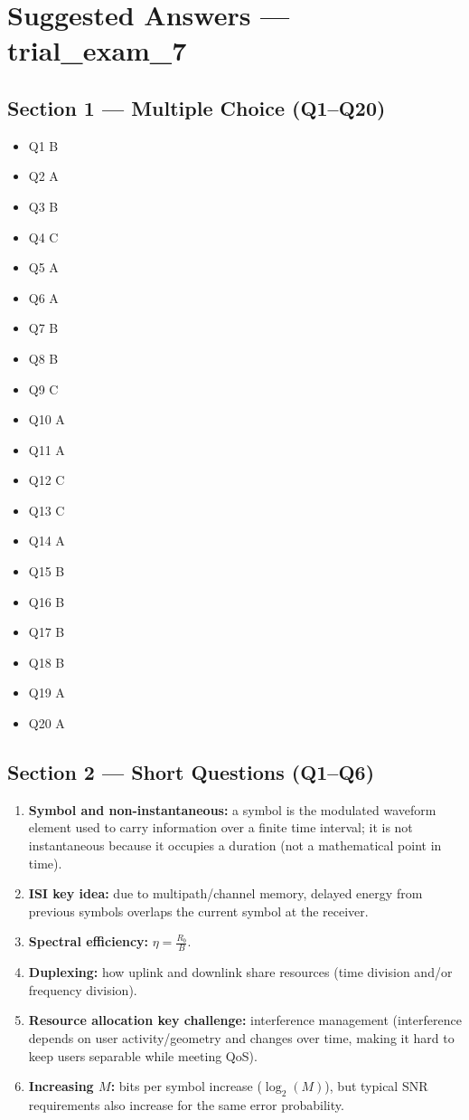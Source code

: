 \documentclass[11pt,a4paper]{article}
\begin{document}
\section*{Suggested Answers --- trial\_exam\_7}

\subsection*{Section 1 --- Multiple Choice (Q1--Q20)}
\begin{itemize}
    \item Q1 B
    \item Q2 A
    \item Q3 B
    \item Q4 C
    \item Q5 A
    \item Q6 A
    \item Q7 B
    \item Q8 B
    \item Q9 C
    \item Q10 A
    \item Q11 A
    \item Q12 C
    \item Q13 C
    \item Q14 A
    \item Q15 B
    \item Q16 B
    \item Q17 B
    \item Q18 B
    \item Q19 A
    \item Q20 A
\end{itemize}

\subsection*{Section 2 --- Short Questions (Q1--Q6)}
\begin{enumerate}[label=\arabic*.]
    \item \textbf{Symbol and non-instantaneous:} a symbol is the modulated waveform element used to carry information over a finite time interval; it is not instantaneous because it occupies a duration (not a mathematical point in time).
    \item \textbf{ISI key idea:} due to multipath/channel memory, delayed energy from previous symbols overlaps the current symbol at the receiver.
    \item \textbf{Spectral efficiency:} $\eta=\frac{R_b}{B}$.
    \item \textbf{Duplexing:} how uplink and downlink share resources (time division and/or frequency division).
    \item \textbf{Resource allocation key challenge:} interference management (interference depends on user activity/geometry and changes over time, making it hard to keep users separable while meeting QoS).
    \item \textbf{Increasing $M$:} bits per symbol increase ($\log_2(M)$), but typical SNR requirements also increase for the same error probability.
    
\end{enumerate}
\end{document}
